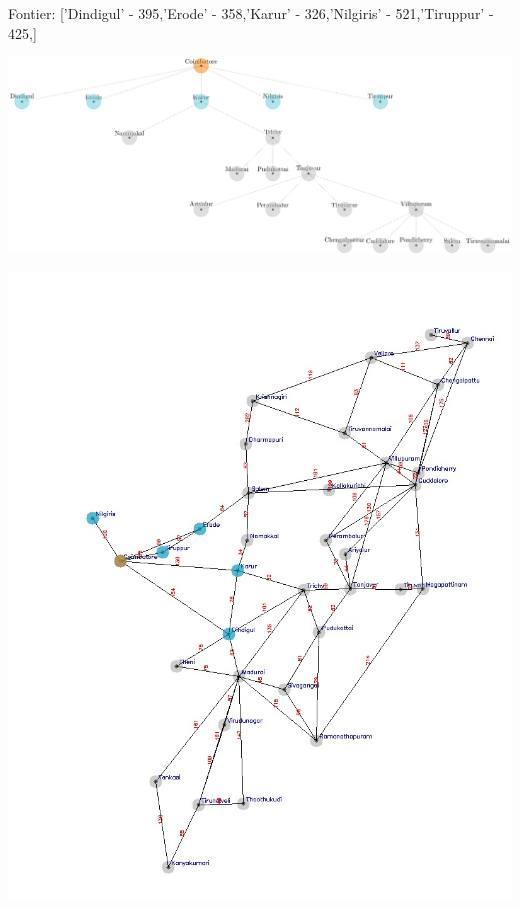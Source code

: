 \documentclass[xcolor=table]{beamer}
\begin{document}
\begin{frame}
  { \tiny Fontier: ['Dindigul' - 395,'Erode' - 358,'Karur' - 326,'Nilgiris' - 521,'Tiruppur' - 425,] }
  \begin{center}
  \includegraphics[height=0.35\textheight]{../GreedyNode/3-1.png}
  \end{center}
  \begin{center}
    \includegraphics[height=0.55\textheight]{../Greedyoutput/tamilGreedy1.jpg}
  \end{center}
\end{frame}
\end{document}
